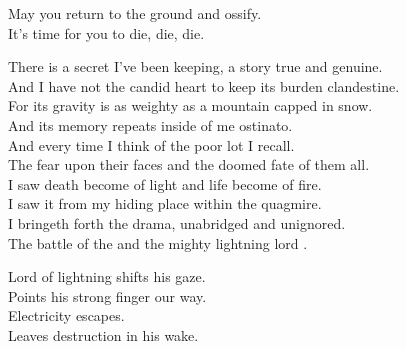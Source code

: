 May you return to the ground and ossify. \\
It's time for you to die, die, die. \\









There is a secret I've been keeping, a story true and genuine. \\
And I have not the candid heart to keep its burden clandestine. \\

For its gravity is as weighty as a mountain capped in snow. \\
And its memory repeats inside of me ostinato. \\

And every time I think of the poor lot I recall. \\
The fear upon their faces and the doomed fate of them all. \\

I saw death become of light and life become of fire. \\
I saw it from my hiding place within the quagmire. \\

I bringeth forth the drama, unabridged and unignored. \\
The battle of the  and the mighty lightning lord . \\





Lord of lightning shifts his gaze. \\
Points his strong finger our way. \\
Electricity escapes. \\
Leaves destruction in his wake. \\

